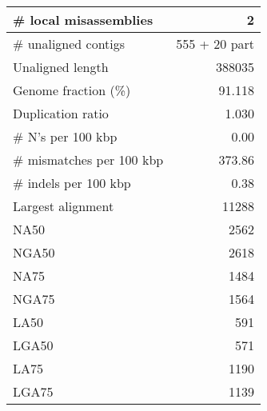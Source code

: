 \documentclass[12pt,a4paper]{article}
\begin{document}
\begin{table}[ht]
\begin{center}
\begin{tabular}{|l*{1}{|r}|}
\# local misassemblies & 2 \\ \hline
\# unaligned contigs & 555 + 20 part \\ \hline
Unaligned length & 388035 \\ \hline
Genome fraction (\%) & 91.118 \\ \hline
Duplication ratio & 1.030 \\ \hline
\# N's per 100 kbp & 0.00 \\ \hline
\# mismatches per 100 kbp & 373.86 \\ \hline
\# indels per 100 kbp & 0.38 \\ \hline
Largest alignment & 11288 \\ \hline
NA50 & 2562 \\ \hline
NGA50 & 2618 \\ \hline
NA75 & 1484 \\ \hline
NGA75 & 1564 \\ \hline
LA50 & 591 \\ \hline
LGA50 & 571 \\ \hline
LA75 & 1190 \\ \hline
LGA75 & 1139 \\ \hline
\end{tabular}
\end{center}
\end{table}
\end{document}
